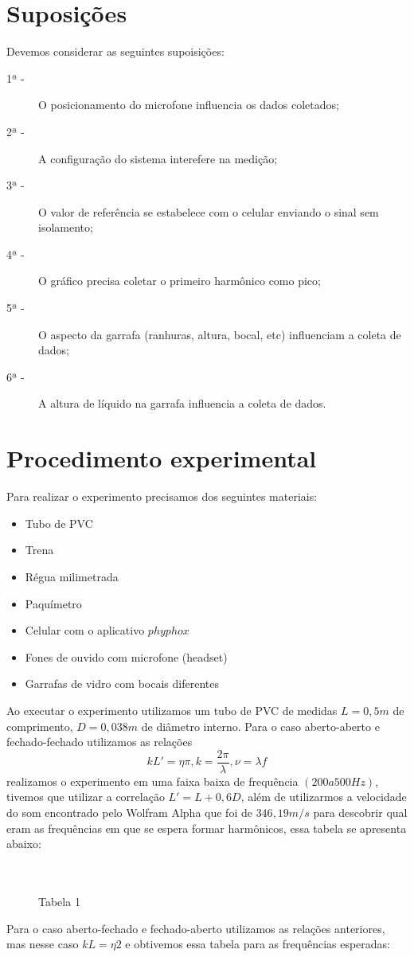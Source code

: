 \documentclass[a4paper]{report}
\begin{document}
\section*{Suposições}
\qquad Devemos considerar as seguintes supoisições:
 \begin{description}
   \item[1ª -] O posicionamento do microfone influencia os dados coletados; 
   \item[2ª -] A configuração do sistema interefere na medição;
   \item[3ª -] O valor de referência se estabelece com o celular enviando o sinal sem isolamento;
   \item[4ª -] O gráfico precisa coletar o primeiro harmônico como pico;
   \item[5ª -] O aspecto da garrafa (ranhuras, altura, bocal, etc) influenciam a coleta de dados;
   \item[6ª -] A altura de líquido na garrafa influencia a coleta de dados.

 \end{description}
 
\section*{Procedimento experimental}
\qquad Para realizar o experimento precisamos dos seguintes materiais: 
\begin{itemize}
    \item Tubo de PVC
    \item Trena
    \item Régua milimetrada
    \item Paquímetro
    \item Celular com o aplicativo $phyphox$
    \item Fones de ouvido com microfone (headset)
    \item Garrafas de vidro com bocais diferentes
\end{itemize}
\qquad Ao executar o experimento utilizamos um tubo de PVC de medidas $L = 0,5 m$ de comprimento, $D =0,038 m$ de diâmetro interno.
	Para o caso aberto-aberto e fechado-fechado utilizamos as relações
 \begin{equation}
     kL' = \eta \pi,  k = \frac{2\pi}\lambda,  \nu = \lambda f
 \end{equation}
 realizamos o experimento em uma faixa baixa de frequência $(200 a 500 Hz)$, tivemos que utilizar a correlação $L' = L + 0,6D$, além de utilizarmos a velocidade do som encontrado pelo Wolfram Alpha que foi de $346,19 m/s$ para descobrir qual eram as frequências em que se espera formar harmônicos, essa tabela se apresenta abaixo:
 \\\\\
\begin{figure}[!htb]
    \centering
    \caption{Tabela 1}
    \label{fig:Figura 1}
\end{figure}
\qquad Para o caso aberto-fechado e fechado-aberto utilizamos as relações anteriores, mas nesse caso $kL = \eta 2$ e obtivemos essa tabela para as frequências esperadas:
\end{document}
